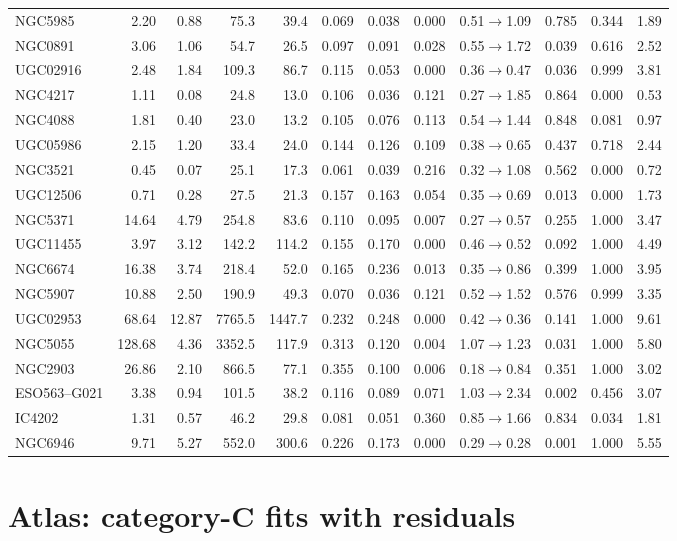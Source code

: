 \documentclass[10pt]{article}
\begin{document}
\begin{landscape}
{\begin{longtable}{lrrrrrrrrrrr}
NGC5985 & 2.20 & 0.88 & 75.3 & 39.4 & 0.069 & 0.038 & 0.000 & 0.51$\to$1.09 & 0.785 & 0.344 & 1.89\\
NGC0891 & 3.06 & 1.06 & 54.7 & 26.5 & 0.097 & 0.091 & 0.028 & 0.55$\to$1.72 & 0.039 & 0.616 & 2.52\\
UGC02916 & 2.48 & 1.84 & 109.3 & 86.7 & 0.115 & 0.053 & 0.000 & 0.36$\to$0.47 & 0.036 & 0.999 & 3.81\\
NGC4217 & 1.11 & 0.08 & 24.8 & 13.0 & 0.106 & 0.036 & 0.121 & 0.27$\to$1.85 & 0.864 & 0.000 & 0.53\\
NGC4088 & 1.81 & 0.40 & 23.0 & 13.2 & 0.105 & 0.076 & 0.113 & 0.54$\to$1.44 & 0.848 & 0.081 & 0.97\\
UGC05986 & 2.15 & 1.20 & 33.4 & 24.0 & 0.144 & 0.126 & 0.109 & 0.38$\to$0.65 & 0.437 & 0.718 & 2.44\\
NGC3521 & 0.45 & 0.07 & 25.1 & 17.3 & 0.061 & 0.039 & 0.216 & 0.32$\to$1.08 & 0.562 & 0.000 & 0.72\\
UGC12506 & 0.71 & 0.28 & 27.5 & 21.3 & 0.157 & 0.163 & 0.054 & 0.35$\to$0.69 & 0.013 & 0.000 & 1.73\\
NGC5371 & 14.64 & 4.79 & 254.8 & 83.6 & 0.110 & 0.095 & 0.007 & 0.27$\to$0.57 & 0.255 & 1.000 & 3.47\\
UGC11455 & 3.97 & 3.12 & 142.2 & 114.2 & 0.155 & 0.170 & 0.000 & 0.46$\to$0.52 & 0.092 & 1.000 & 4.49\\
NGC6674 & 16.38 & 3.74 & 218.4 & 52.0 & 0.165 & 0.236 & 0.013 & 0.35$\to$0.86 & 0.399 & 1.000 & 3.95\\
NGC5907 & 10.88 & 2.50 & 190.9 & 49.3 & 0.070 & 0.036 & 0.121 & 0.52$\to$1.52 & 0.576 & 0.999 & 3.35\\
UGC02953 & 68.64 & 12.87 & 7765.5 & 1447.7 & 0.232 & 0.248 & 0.000 & 0.42$\to$0.36 & 0.141 & 1.000 & 9.61\\
NGC5055 & 128.68 & 4.36 & 3352.5 & 117.9 & 0.313 & 0.120 & 0.004 & 1.07$\to$1.23 & 0.031 & 1.000 & 5.80\\
NGC2903 & 26.86 & 2.10 & 866.5 & 77.1 & 0.355 & 0.100 & 0.006 & 0.18$\to$0.84 & 0.351 & 1.000 & 3.02\\
ESO563--G021 & 3.38 & 0.94 & 101.5 & 38.2 & 0.116 & 0.089 & 0.071 & 1.03$\to$2.34 & 0.002 & 0.456 & 3.07\\
IC4202 & 1.31 & 0.57 & 46.2 & 29.8 & 0.081 & 0.051 & 0.360 & 0.85$\to$1.66 & 0.834 & 0.034 & 1.81\\
NGC6946 & 9.71 & 5.27 & 552.0 & 300.6 & 0.226 & 0.173 & 0.000 & 0.29$\to$0.28 & 0.001 & 1.000 & 5.55\\
\end{longtable}}\end{landscape}
\section*{Atlas: category-C fits with residuals}
\end{document}
